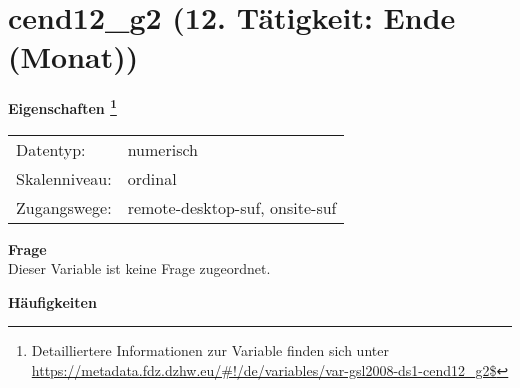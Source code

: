 
    \setcounter{footnote}{0}

    \vspace*{-1.8cm}
	\section{cend12\_g2 (12. Tätigkeit: Ende (Monat))}
	\label{section:cend12_g2}



    \vspace*{0.5cm}
    \noindent\textbf{Eigenschaften
	\footnote{Detailliertere Informationen zur Variable finden sich unter
		\url{https://metadata.fdz.dzhw.eu/\#!/de/variables/var-gsl2008-ds1-cend12_g2$}}}\\
	\begin{tabularx}{\hsize}{@{}lX}
	Datentyp: & numerisch \\
	Skalenniveau: & ordinal \\
	Zugangswege: &
	  remote-desktop-suf, 
	  onsite-suf
 \\
    \end{tabularx}



		\vspace*{0.5cm}
		\noindent\textbf{Frage}\\
		Dieser Variable ist keine Frage zugeordnet.





        		\vspace*{0.5cm}
                \noindent\textbf{Häufigkeiten}

